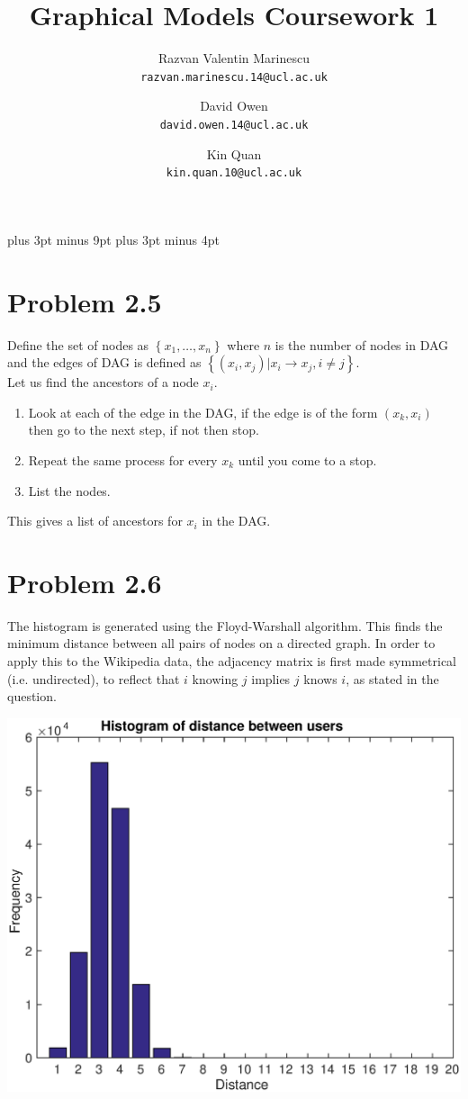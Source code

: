\documentclass[11pt,a4paper,oneside]{report}
\title{Graphical Models Coursework 1}
\author{
    Razvan Valentin Marinescu\\
    \texttt{razvan.marinescu.14@ucl.ac.uk}
    \and
    David Owen\\
    \texttt{david.owen.14@ucl.ac.uk}
    \and
    Kin Quan\\
    \texttt{kin.quan.10@ucl.ac.uk}
}
\begin{document}
\belowdisplayskip=12pt plus 3pt minus 9pt
\belowdisplayshortskip=7pt plus 3pt minus 4pt

\maketitle{}


\section*{Problem 2.5}
Define the set of nodes as $\left\{x_{1}, \ldots , x_{n} \right\}$ where $n$ is the number of nodes in DAG and the edges of DAG is defined as $\left\{ (x_{i},x_{j}) | x_{i} \rightarrow x_{j}, i \neq j \right\}$. \\
\newline
Let us find the ancestors of a node $x_{i}$.
\begin{enumerate}
	\item Look at each of the edge in the DAG, if the edge is of the form $(x_{k},x_{i})$ then go to the next step, if not then stop.
	\item Repeat the same process for every $x_{k}$ until you come to a stop.
	\item List the nodes.
\end{enumerate}
This gives a list of ancestors for $x_{i}$ in the DAG.

\section*{Problem 2.6}

The histogram is generated using the Floyd-Warshall algorithm. This finds the minimum distance between all pairs of nodes on a directed graph. In order to apply this to the Wikipedia data, the adjacency matrix is first made symmetrical (i.e. undirected), to reflect that $i$ knowing $j$ implies $j$ knows $i$, as stated in the question.


\includegraphics[scale=0.6]{plots/206_histogram}
\end{document}
